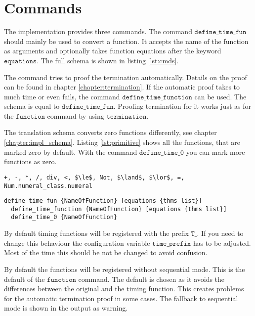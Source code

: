 

\section{Commands}\label{chapter:commands}

The implementation provides three commands.
The command $\texttt{define\_time\_fun}$ should mainly be used to convert a function.
It accepts the name of the function as arguments and optionally takes function equations after the keyword $\texttt{equations}$.
The full schema is shown in listing \ref{lst:cmds}.

The command tries to proof the termination automatically.
Details on the proof can be found in chapter \ref{chapter:termination}.
If the automatic proof takes to much time or even fails, the command $\texttt{define\_time\_function}$ can be used.
The schema is equal to $\texttt{define\_time\_fun}$.
Proofing termination for it works just as for the $\texttt{function}$ command by using $\texttt{termination}$.

The translation schema converts zero functions differently, see chapter \ref{chapter:impl_schema}.
Listing \ref{lst:primitive} shows all the functions, that are marked zero by default.
With the command $\texttt{define\_time\_0}$ you can mark more functions as zero.

\begin{lstlisting}[float,label=lst:primitive,caption=Functions primitive by default,mathescape=true]
  +, -, *, /, div, <, $\le$, Not, $\land$, $\lor$, =, Num.numeral_class.numeral
\end{lstlisting}

\begin{lstlisting}[float,label=lst:cmds,caption=Schema of implemented command]
  define_time_fun {NameOfFunction} [equations {thms list}]
  define_time_function {NameOfFunction} [equations {thms list}]
  define_time_0 {NameOfFunction}
\end{lstlisting}

By default timing functions will be registered with the prefix $\texttt{T\_}$.
If you need to change this behaviour the configuration variable $\texttt{time\_prefix}$ has to be adjusted.
Most of the time this should be not be changed to avoid confusion.

By default the functions will be registered without sequential mode. This is the default of the $\texttt{function}$ command.
The default is chosen as it avoids the differences between the original and the timing function.
This creates problems for the automatic termination proof in some cases.
The fallback to sequential mode is shown in the output as warning.
